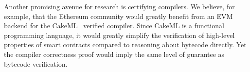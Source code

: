 \documentclass[sigplan,10pt,review]{acmart}\settopmatter{printfolios=true,printccs=false,printacmref=false}
\begin{document}
Another promising avenue for research is certifying compilers.
We believe, for example, that the Ethereum community
would greatly benefit from an EVM backend for the CakeML~\cite{Owens_NKMT_17}
verified compiler.
Since CakeML is a functional programming language, it would
greatly simplify the verification of high-level properties
of smart contracts compared to reasoning about bytecode directly.
Yet the compiler correctness proof would imply the
same level of guarantee as bytecode verification.








\end{document}
